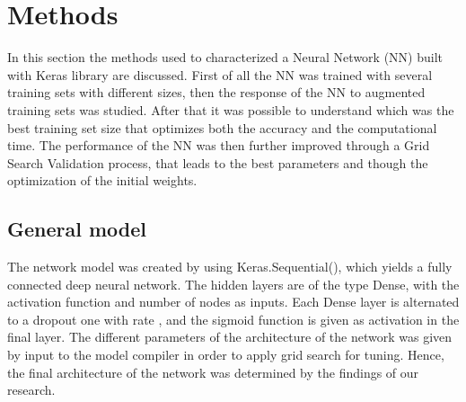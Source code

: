 \documentclass[prl,twocolumn]{revtex4-1}
\begin{document}
 \section{Methods}
In this section the methods used to characterized a Neural Network (NN) built with Keras library are discussed. First of all the NN was trained with several training sets with different sizes, then the response of the NN to augmented training sets was studied. 
After that it was possible to understand which was the best training set size that optimizes both the accuracy and the computational time. The performance of the NN was then further improved through a Grid Search Validation process, that leads to the best parameters and though the optimization of the initial weights.
\subsection{General model}
The network model was created by using Keras.Sequential(), which yields a fully connected deep neural network. The hidden layers are of the type Dense, with the activation function and number of nodes as inputs. Each Dense layer is alternated to a dropout one with rate , and the sigmoid function is given as activation in the final layer. The different parameters of the architecture of the network was given by input to the model compiler in order to apply grid search for tuning. Hence, the final architecture of the network was determined by the findings of our research.
\end{document}
